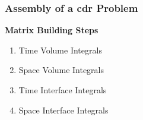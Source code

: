 \begin{frame} %
    \frametitle{Assembly of a \acrshort{cdr} Problem}


    \vspace*{\fill}
    \begin{multicols}{2}
        
        \vspace*{\fill}
        \begin{center}
            {\color{\accentcolor} \Large \textbf{Matrix Building Steps}}
            \vspace*{0.5cm}

            \begin{minipage}{0.4\textwidth}
                \begin{enumerate}[<+>]
                    \item<2> Time Volume Integrals
                    \item<3> Space Volume Integrals
                    \item<4> Time Interface Integrals
                    \item<5> Space Interface Integrals
                \end{enumerate}
            \end{minipage}
        \end{center}
        \vspace*{\fill}

        \vfill\null
        \columnbreak

        \vspace*{\fill}





\end{multicols}
\end{frame}
